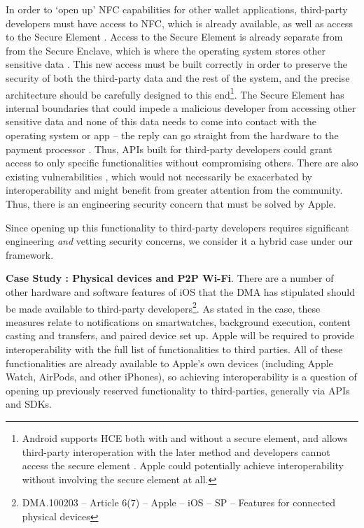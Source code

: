 \documentclass[letterpaper,twocolumn,10pt]{article}
\newcommand{\subh}[1]{\smallskip \noindent \textbf{{#1}}.}
\renewcommand{\paragraph}[1]{\subh{#1}}
\begin{document}
In order to `open up' NFC capabilities for other wallet applications, third-party developers must have access to NFC, which is already available, as well as access to the Secure Element \cite{apple_se_press_release}.  Access to the Secure Element is already separate from from the Secure Enclave, which is where the operating system stores other sensitive data \cite{apple_security}.  This new access must be built correctly in order to preserve the security of both the third-party data and the rest of the system, and the precise architecture should be carefully designed to this end\footnote{Android supports HCE both with and without a secure element, and allows third-party interoperation with the later method and developers cannot access the secure element \cite{android_hce}. Apple could potentially achieve interoperability without involving the secure element at all.}. 
The Secure Element has internal boundaries that could impede a malicious developer from accessing other sensitive data and none of this data needs to come into contact with the operating system or app -- the reply can go straight from the hardware to the payment processor \cite{evil}.  Thus, APIs built for third-party developers could grant access to only specific functionalities without compromising others.  There are also existing vulnerabilities \cite{evil}, which would not necessarily be exacerbated by interoperability and might benefit from greater attention from the community.  Thus, there is an engineering security concern that must be solved by Apple. 

Since opening up this functionality to third-party developers requires significant engineering \emph{and} vetting security concerns, we consider it a hybrid case under our framework.

\paragraph{Case Study \thecasestudy: Physical devices and P2P Wi-Fi}
There are a number of other hardware and software features of iOS that the DMA has stipulated should be made available to third-party developers\footnote{DMA.100203 – Article 6(7) – Apple – iOS – SP – Features for connected physical devices}.  As stated in the case, these measures relate to notifications on smartwatches, background execution, content casting and transfers, and paired device set up.  Apple will be required to provide interoperability with the full list of functionalities to third parties.  All of these functionalities are already available to Apple's own devices (including Apple Watch, AirPods, and other iPhones), so achieving interoperability is a question of opening up previously reserved functionality to third-parties, generally via APIs and SDKs.
\end{document}
